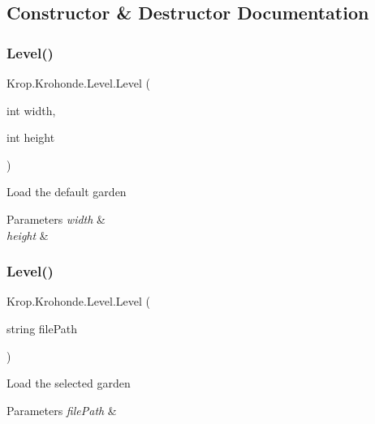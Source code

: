 \subsection{Constructor \& Destructor Documentation}
\mbox{\label{struct_krop_1_1_krohonde_1_1_level_aac39539c546fa2284e8ff762b4898c98}} 
\subsubsection{\texorpdfstring{Level()}{Level()}\hspace{0.1cm}{\footnotesize\ttfamily [1/2]}}
{\footnotesize\ttfamily Krop.\+Krohonde.\+Level.\+Level (\begin{DoxyParamCaption}\item[{int}]{width,  }\item[{int}]{height }\end{DoxyParamCaption})}



Load the default garden 


\begin{DoxyParams}{Parameters}
{\em width} & \\
\hline
{\em height} & \\
\hline
\end{DoxyParams}
\mbox{\label{struct_krop_1_1_krohonde_1_1_level_a1e442ecde4d1692da04bb530c451d421}} 
\subsubsection{\texorpdfstring{Level()}{Level()}\hspace{0.1cm}{\footnotesize\ttfamily [2/2]}}
{\footnotesize\ttfamily Krop.\+Krohonde.\+Level.\+Level (\begin{DoxyParamCaption}\item[{string}]{file\+Path }\end{DoxyParamCaption})}



Load the selected garden 


\begin{DoxyParams}{Parameters}
{\em file\+Path} & \\
\hline
\end{DoxyParams}


